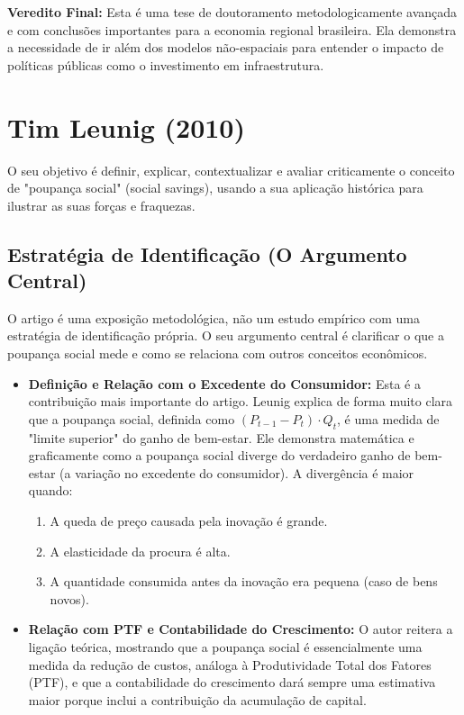 \documentclass[12pt, a4paper]{article}
\begin{document}
\noindent\textbf{Veredito Final:} Esta é uma tese de doutoramento metodologicamente avançada e com conclusões importantes para a economia regional brasileira. Ela demonstra a necessidade de ir além dos modelos não-espaciais para entender o impacto de políticas públicas como o investimento em infraestrutura. 

\section{Tim Leunig (2010)}
O seu objetivo é definir, explicar, contextualizar e avaliar criticamente o conceito de "poupança social" (social savings), usando a sua aplicação histórica para ilustrar as suas forças e fraquezas.

\subsection{Estratégia de Identificação (O Argumento Central)}
O artigo é uma exposição metodológica, não um estudo empírico com uma estratégia de identificação própria. O seu argumento central é clarificar o que a poupança social mede e como se relaciona com outros conceitos econômicos.

\begin{itemize}
    \item \textbf{Definição e Relação com o Excedente do Consumidor:} Esta é a contribuição mais importante do artigo. Leunig explica de forma muito clara que a poupança social, definida como $(P_{t-1} - P_t) \cdot Q_t$, é uma medida de "limite superior" do ganho de bem-estar. Ele demonstra matemática e graficamente como a poupança social diverge do verdadeiro ganho de bem-estar (a variação no excedente do consumidor). A divergência é maior quando:
        \begin{enumerate}
            \item A queda de preço causada pela inovação é grande.
            \item A elasticidade da procura é alta.
            \item A quantidade consumida antes da inovação era pequena (caso de bens novos).
        \end{enumerate}
    \item \textbf{Relação com PTF e Contabilidade do Crescimento:} O autor reitera a ligação teórica, mostrando que a poupança social é essencialmente uma medida da redução de custos, análoga à Produtividade Total dos Fatores (PTF), e que a contabilidade do crescimento dará sempre uma estimativa maior porque inclui a contribuição da acumulação de capital.
\end{itemize}
\end{document}
